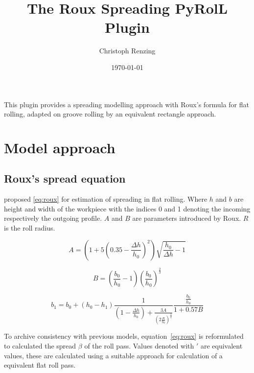 \documentclass[11pt]{PyRollDocs}
\begin{document}
    \title{The Roux Spreading PyRolL Plugin}
    \author{Christoph Renzing}
    \date{\today}

    \maketitle

    This plugin provides a spreading modelling approach with Roux's formula for flat rolling, adapted on groove rolling by an equivalent rectangle approach.


    \section{Model approach}\label{sec:model-approach}

    \subsection{Roux's spread equation}\label{subsec:roux's-spread-equation}

    \textcite{Roux1939} proposed \autoref{eq:roux} for estimation of spreading in flat rolling.
    Where $h$ and $b$ are height and width of the workpiece with the indices 0 and 1 denoting the incoming respectively the outgoing profile.
    $A$ and $B$ are parameters introduced by Roux.
    $R$ is the roll radius.


    \begin{equation}
        A = \left( 1 + 5 \left( 0.35 - \frac{\Delta h}{h_0}\right)^2 \right) \sqrt{\frac{h_0}{\Delta h} - 1}
        \label{eq:roux-parameter-a}
    \end{equation}

    \begin{equation}
        B = \left( \frac{b_0}{h_0} - 1 \right) \left( \frac{b_0}{h_0} \right)^{\frac{2}{3}}
        \label{eq:roux-parameter-b}
    \end{equation}

    \begin{equation}
        b_1 = b_0 + \left( h_0 - h_1 \right) \frac{1}{\left( 1 - \frac{\Delta h}{h_0} \right) + \frac{3 A}{\left( 2 \frac{R}{h_0} \right)^{\frac{3}{4}}}} \frac{\frac{b_0}{h_0}}{1 + 0.57 B}
        \label{eq:roux}
    \end{equation}

    To archive consistency with previous models, equation~\ref{eq:roux} is reformulated to calculated the spread $\beta$ of the roll pass.
    Values denoted with $'$ are equivalent values, these are calculated using a suitable approach for calculation of a equivalent flat roll pass.
\end{document}
